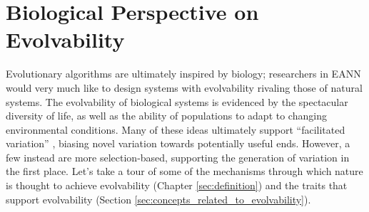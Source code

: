 \chapter{Biological Perspective on Evolvability} \label{sec:biological_perspective_on_evolvability}

Evolutionary algorithms are ultimately inspired by biology; researchers in EANN would very much like to design systems with evolvability rivaling those of natural systems. The evolvability of biological systems is evidenced by the spectacular diversity of life, as well as the ability of populations to adapt to changing environmental conditions. Many of these ideas ultimately support ``facilitated variation'' \cite[pg. 40]{Downing2015IntelligenceSystems}, biasing novel variation towards potentially useful ends. However, a few instead are more selection-based, supporting the generation of variation in the first place. Let's take a tour of some of the mechanisms through which nature is thought to achieve evolvability (Chapter \ref{sec:definition}) and the traits that support evolvability (Section \ref{sec:concepts_related_to_evolvability}).


        
